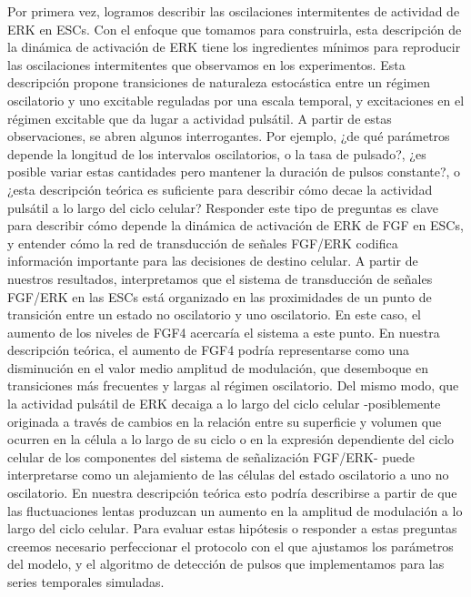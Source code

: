 \documentclass[./main.tex]{subfiles}
\begin{document}
Por primera vez, logramos describir las oscilaciones intermitentes de actividad de ERK en ESCs. Con el enfoque que tomamos para construirla, esta descripción de la dinámica de activación de ERK tiene los ingredientes mínimos para reproducir las oscilaciones intermitentes que observamos en los experimentos. Esta descripción propone transiciones de naturaleza estocástica entre un régimen oscilatorio y uno excitable reguladas por una escala temporal, y excitaciones en el régimen excitable que da lugar a actividad pulsátil. A partir de estas observaciones, se abren algunos interrogantes. Por ejemplo, ¿de qué parámetros depende la longitud de los intervalos oscilatorios, o la tasa de pulsado?, ¿es posible variar estas cantidades pero mantener la duración de pulsos constante?, o ¿esta descripción teórica es suficiente para describir cómo decae la actividad pulsátil a lo largo del ciclo celular? Responder este tipo de preguntas es clave para describir cómo depende la dinámica de activación de ERK de FGF en ESCs, y entender cómo la red de transducción de señales FGF/ERK codifica información importante para las decisiones de destino celular. A partir de nuestros resultados, interpretamos que el sistema de transducción de señales FGF/ERK en las ESCs está organizado en las proximidades de un punto de transición entre un estado no oscilatorio y uno oscilatorio. En este caso, el aumento de los niveles de FGF4 acercaría el sistema a este punto. En nuestra descripción teórica, el aumento de FGF4 podría representarse como una disminución en el valor medio amplitud de modulación, que desemboque en transiciones más frecuentes y largas al régimen oscilatorio. Del mismo modo, que la actividad pulsátil de ERK decaiga a lo largo del ciclo celular -posiblemente originada a través de cambios en la relación entre su superficie y volumen que ocurren en la célula a lo largo de su ciclo o en la expresión dependiente del ciclo celular de los componentes del sistema de señalización FGF/ERK- puede interpretarse como un alejamiento de las células del estado oscilatorio a uno no oscilatorio. En nuestra descripción teórica esto podría describirse a partir de que las fluctuaciones lentas produzcan un aumento en la amplitud de modulación a lo largo del ciclo celular. Para evaluar estas hipótesis o responder a estas preguntas creemos necesario perfeccionar el protocolo con el que ajustamos los parámetros del modelo, y el algoritmo de detección de pulsos que implementamos para las series temporales simuladas.


\end{document}
